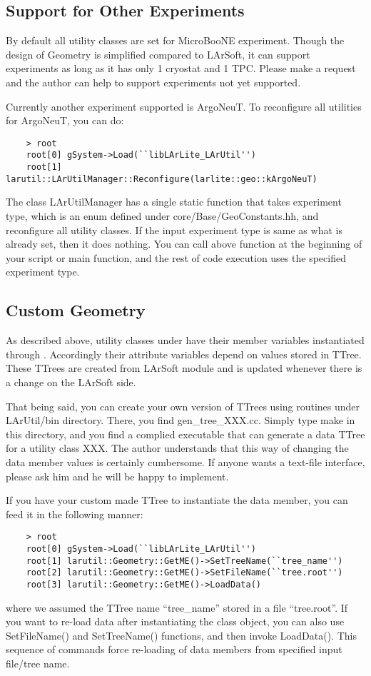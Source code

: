 \subsection{Support for Other Experiments}
By default all utility classes are set for MicroBooNE experiment. Though the design of {\ttfamily Geometry} is simplified compared to LArSoft, it can support experiments as long as it has only 1 cryostat and 1 TPC. Please make a request and the author can help to support experiments not yet supported. 

Currently another experiment supported is ArgoNeuT. To reconfigure all utilities for ArgoNeuT, you can do:
\begin{lstlisting}
    > root
    root[0] gSystem->Load(``libLArLite_LArUtil'')
    root[1] larutil::LArUtilManager::Reconfigure(larlite::geo::kArgoNeuT)
\end{lstlisting}
The class {\ttfamily LArUtilManager} has a single static function that takes experiment type, which is an {\ttfamily enum} defined under {\ttfamily core/Base/GeoConstants.hh}, and reconfigure all utility classes. If the input experiment type is same as what is already set, then it does nothing. You can call above function at the beginning of your script or {\ttfamily main} function, and the rest of code execution uses the specified experiment type.

\subsection{Custom Geometry}
As described above, utility classes under \LArUtil have their member variables instantiated through . Accordingly their attribute variables depend on values stored in {\ttfamily TTree}. These {\ttfamily TTree}s are created from LArSoft module and is updated whenever there is a change on the LArSoft side. 

That being said, you can create your own version of TTrees using routines under {\ttfamily LArUtil/bin} directory. There, you find {\ttfamily gen\_tree\_XXX.cc}. Simply type {\ttfamily make} in this directory, and you find a complied executable that can generate a data {\ttfamily TTree} for a utility class {\ttfamily XXX}. The author understands that this way of changing the data member values is certainly cumbersome. If anyone wants a text-file interface, please ask him and he will be happy to implement.

If you have your custom made {\ttfamily TTree} to instantiate the data member, you can feed it in the following manner:
\begin{lstlisting}
    > root
    root[0] gSystem->Load(``libLArLite_LArUtil'')
    root[1] larutil::Geometry::GetME()->SetTreeName(``tree_name'')
    root[2] larutil::Geometry::GetME()->SetFileName(``tree.root'')
    root[3] larutil::Geometry::GetME()->LoadData()
\end{lstlisting}
where we assumed the {\ttfamily TTree} name ``tree\_name'' stored in a \ROOT file ``tree.root''. If you want to re-load data after instantiating the class object, you can also use {\ttfamily SetFileName()} and {\ttfamily SetTreeName()} functions, and then invoke {\ttfamily LoadData()}. This sequence of commands force re-loading of data members from specified input file/tree name.
